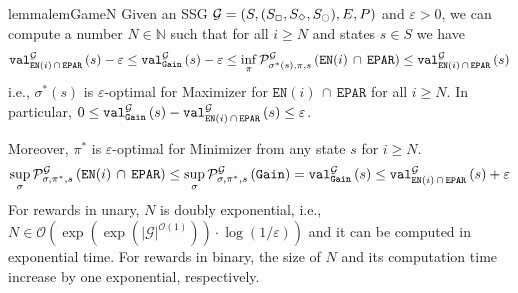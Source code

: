 \documentclass[a4paper,UKenglish,cleveref,autoref,thm-restate]{lipics-v2021}
\DeclareMathOperator{\Gain}{\mathtt{Gain}}
\newcommand{\Eparity}{\mathtt{EPAR}}
\newcommand{\en}{\mathtt{EN}}
\newcommand{\+}[1]{\mathbb{#1}}
\newcommand{\?}[1]{\mathcal{#1}}
\newcommand{\N}{\+{N}}
\newcommand{\Ocompl}{\?{O}}
\newcommand{\rsymbol}{\ocircle}
\newcommand{\zsymbol}{\Box}
\newcommand{\osymbol}{\Diamond}
\newcommand{\zstates}{\states_\zsymbol}
\newcommand{\rstates}{\states_\rsymbol}
\newcommand{\ostates}{\states_\osymbol}
\newcommand{\abs}[1]{\lvert#1\rvert}
\newcommand{\size}[1]{\abs{#1}}
\newcommand{\eps}{\varepsilon}
\newcommand{\Prob}[2][]{\mathcal{P}^{#1}_{#2}}
\newcommand{\lrc}[1]{\left(#1\right)}
\newcommand{\tuple}[1]{\lrc{#1}}
\newcommand{\game}{{\mathcal G}}
\newcommand{\gametuple}{\tuple{\states,(\zstates,\ostates,\rstates),\transition,\probp}}
\newcommand{\states}{S}
\newcommand{\s}{s}
\newcommand{\transition}{{E}}
\newcommand{\probp}{P}
\newcommand{\zstrat}{\sigma}
\newcommand{\ostrat}{\pi}
\newcommand{\optzstrat}{\zstrat^*}
\newcommand{\optostrat}{\ostrat^*}
\begin{document}
\begin{restatable}{lemma}{lemGameN}\label{lem:Game-N}
Given an SSG $\game=\gametuple$ and $\eps >0$, we can compute a number $N \in \N$
such that for all $i \ge N$ and states $\s \in \states$ we have
\begin{equation}\label{lem:Game-N-a}
  \valueof[\game][\en(i)\, \cap\, \Eparity]{\s} - \eps
  \le
  \valueof[\game][\Gain]{\s} - \eps
  \le
  \inf_\ostrat \Prob[\game]{\optzstrat(\s),\ostrat,\s}\lrc{\en(i)\,\cap\,\Eparity}
  \le
  \valueof[\game][\en(i)\,\cap\,\Eparity]{\s}
\end{equation}
i.e., $\optzstrat(\s)$ is $\eps$-optimal for Maximizer for $\en(i)\,\cap\,\Eparity$ for all $i \ge N$.
In particular, $0 \le \valueof[\game][\Gain]{\s} - \valueof[\game][\en(i)\,\cap\,\Eparity]{\s} \le \eps$.

Moreover, $\optostrat$ is $\eps$-optimal for Minimizer from any state $\s$ for $i \ge N$.
\begin{equation}\label{lem:Game-N-b}
  \sup_{\zstrat}\Prob[\game]{\zstrat,\optostrat,\s}\lrc{\en(i)\,\cap\,\Eparity}
  \le
  \sup_{\zstrat}\Prob[\game]{\zstrat,\optostrat,\s}\lrc{\Gain}
  =
  \valueof[\game][\Gain]{\s}
  \le
  \valueof[\game][\en(i)\,\cap\,\Eparity]{\s} + \eps
\end{equation}
For rewards in unary, $N$ is doubly exponential, i.e.,
$N \in {\Ocompl}\left(\exp(\exp(\size{\game}^{\Ocompl(1)}))\cdot \log\lrc{1/\eps}\right)$
and it can be computed in exponential time.
For rewards in binary, the size of $N$ and its computation time increase
by one exponential, respectively.
\end{restatable}
\end{document}
